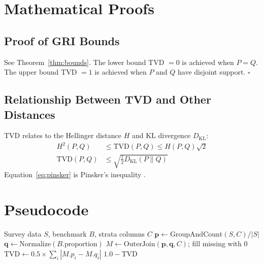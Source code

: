 \documentclass[11pt,a4paper]{article}
\begin{document}



\appendix

\section{Mathematical Proofs}\label{app:proofs}

\subsection{Proof of GRI Bounds}

See Theorem~\ref{thm:bounds}. The lower bound TVD $= 0$ is achieved when $P = Q$. The upper bound TVD $= 1$ is achieved when $P$ and $Q$ have disjoint support. $\square$

\subsection{Relationship Between TVD and Other Distances}

TVD relates to the Hellinger distance $H$ and KL divergence $D_{\text{KL}}$:
\begin{align}
    H^2(P,Q) &\leq \text{TVD}(P,Q) \leq H(P,Q)\sqrt{2} \label{eq:hellinger_bound} \\
    \text{TVD}(P,Q) &\leq \sqrt{\tfrac{1}{2} D_{\text{KL}}(P \| Q)} \label{eq:pinsker}
\end{align}
Equation~\eqref{eq:pinsker} is Pinsker's inequality \citep{lecam1986asymptotic,tsybakov2009introduction}.

\section{Pseudocode}\label{app:pseudocode}

\begin{algorithm}
\caption{GRI Calculation}\label{alg:gri}
\begin{algorithmic}[1]
\Require Survey data $S$, benchmark $B$, strata columns $C$
\State $\mathbf{p} \gets \text{GroupAndCount}(S, C) / |S|$
\State $\mathbf{q} \gets \text{Normalize}(B.\text{proportion})$
\State $M \gets \text{OuterJoin}(\mathbf{p}, \mathbf{q}, C)$; fill missing with 0
\State $\text{TVD} \gets 0.5 \times \sum_i |M.p_i - M.q_i|$
\State \Return $1.0 - \text{TVD}$
\end{algorithmic}
\end{algorithm}
\end{document}

